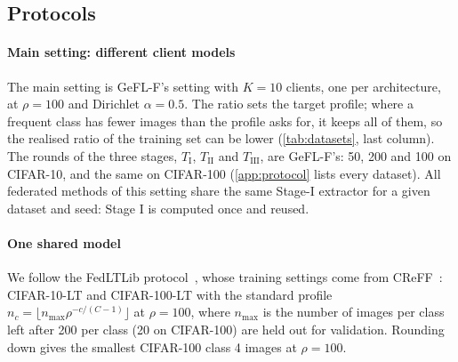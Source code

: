 \begin{table}[t]
\centering\small
\caption{Datasets as used: classes, training images held by the clients, test images, and the realised ratio between
the largest and the smallest class in the federation (natural imbalance: the dataset's own class sizes).}
\label{tab:datasets}
\end{table}

\subsection{Protocols}\label{sec:setup-protocols}

\paragraph{Main setting: different client models} The main setting is GeFL-F's setting with $K=10$ clients, one
per architecture, at $\rho=100$ and Dirichlet $\alpha=0.5$. The ratio sets the target profile; where a
frequent class has fewer images than the profile asks for, it keeps all of them, so the realised ratio of the
training set can be lower (\cref{tab:datasets}, last column). The rounds of the three
stages, $T_{\mathrm{I}}$, $T_{\mathrm{II}}$ and $T_{\mathrm{III}}$, are GeFL-F's: 50, 200 and 100 on CIFAR-10, and the same on CIFAR-100
(\cref{app:protocol} lists every dataset). All federated methods of this setting share the same Stage-I extractor for
a given dataset and seed: Stage I is computed once and reused.

\paragraph{One shared model} We follow the FedLTLib protocol~\cite{lin2026fedltlib}, whose training settings come
from CReFF~\cite{shang2022creff}: CIFAR-10-LT and CIFAR-100-LT with
the standard profile $n_c=\lfloor n_{\max}\rho^{-c/(C-1)}\rfloor$ at $\rho=100$, where $n_{\max}$ is the
number of images per class left after 200 per class (20 on CIFAR-100) are held out for validation. Rounding down gives
the smallest CIFAR-100 class 4 images at $\rho=100$.

